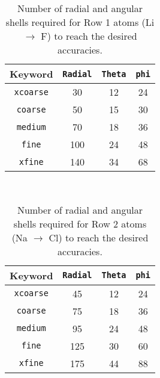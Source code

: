 \begin{center}
\begin{table}[htb]
\caption{Number of radial and angular shells required for Row 1 atoms
  (Li $\rightarrow$ F) to reach the desired accuracies.}

\vspace{.2in}

  \begin{tabular}[right]{|c|c|c|c|} \hline
Keyword & {\tt Radial} & {\tt Theta} & {\tt phi} \\ \hline
{\tt xcoarse} & 30 & 12 & 24  \\ \hline
{\tt coarse}  & 50 & 15 & 30  \\ \hline
{\tt medium}  & 70 & 18 & 36  \\ \hline
{\tt fine}    &100 & 24 & 48  \\ \hline
{\tt xfine}   &140 & 34 & 68  \\ \hline
  \end{tabular} \\
\end{table}
\end{center}

\begin{center}
\begin{table}[htb]
\caption{Number of radial and angular shells required for Row 2 atoms
  (Na $\rightarrow$ Cl) to reach the desired accuracies.}

\vspace{.2in}

  \begin{tabular}[right]{|c|c|c|c|} \hline
Keyword & {\tt Radial} & {\tt Theta} & {\tt phi} \\ \hline
{\tt xcoarse} & 45 & 12 & 24  \\ \hline
{\tt coarse}  & 75 & 18 & 36  \\ \hline
{\tt medium}  & 95 & 24 & 48  \\ \hline
{\tt fine}    &125 & 30 & 60  \\ \hline
{\tt xfine}   &175 & 44 & 88  \\ \hline
  \end{tabular} \\
\end{table}
\end{center}

